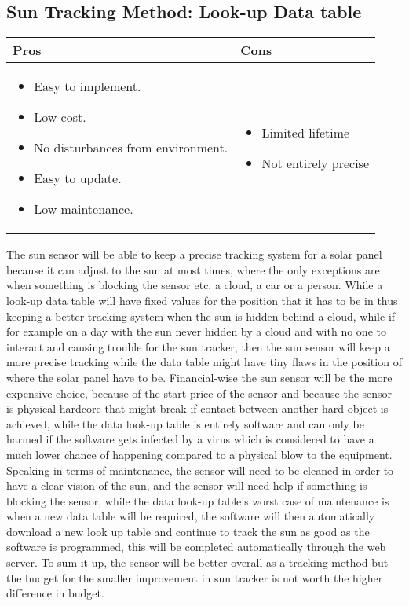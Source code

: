 \subsection{Sun Tracking Method: Look-up Data table}
\begin{tabular}{|p{8cm}|p{8cm}|}
\hline Pros & Cons\\ 

\hline 
\begin{itemize}
\item Easy to implement.
\item Low cost.
\item No disturbances from environment.
\item Easy to update.
\item Low maintenance.
\end{itemize}

& 
\begin{itemize}
\item Limited lifetime
\item Not entirely precise
\end{itemize}
  \\ 
\hline 
\end{tabular} 

The sun sensor will be able to keep a precise tracking system for a solar panel because it can adjust to the sun at most times, where the only exceptions are when something is blocking the sensor etc. a cloud, a car or a person. While a look-up data table will have fixed values for the position that it has to be in thus keeping a better tracking system when the sun is hidden behind a cloud, while if for example on a day with the sun never hidden by a cloud and with no one to interact and causing trouble for the sun tracker, then the sun sensor will keep a more precise tracking while the data table might have tiny flaws in the position of where the solar panel have to be.  Financial-wise the sun sensor will be the more expensive choice, because of the start price of the sensor and because the sensor is physical hardcore that might break if contact between another hard object is achieved, while the data look-up table is entirely software and can only be harmed if the software gets infected by a virus which is considered to have a much lower chance of happening compared to a physical blow to the equipment.  Speaking in terms of maintenance, the sensor will need to be cleaned in order to have a clear vision of the sun, and the sensor will need help if something is blocking the sensor, while the data look-up table’s worst case of maintenance is when a new data table will be required, the software will then automatically download a new look up table and continue to track the sun as good as the software is programmed, this will be completed automatically through the web server. To sum it up, the sensor will be better overall as a tracking method but the budget for the smaller improvement in sun tracker is not worth the higher difference in budget. 

